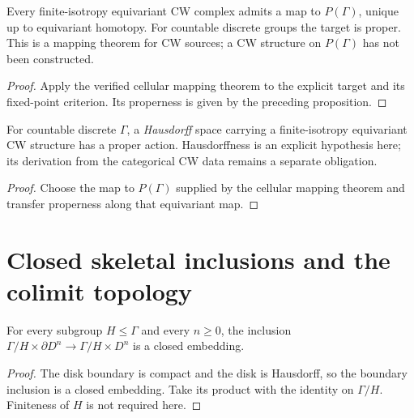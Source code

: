 \begin{proposition}\label{prop:probability-cellular-target}
Every finite-isotropy equivariant CW complex admits a map to $P(\Gamma)$,
unique up to equivariant homotopy. For countable discrete groups the target
is proper. This is a mapping theorem for CW sources; a CW structure on
$P(\Gamma)$ has not been constructed.
\end{proposition}
\begin{proof}
\leanok
Apply the verified cellular mapping theorem to the explicit target and its
fixed-point criterion. Its properness is given by the preceding proposition.
\end{proof}

\begin{proposition}\label{prop:hausdorff-equivariant-cw-proper}
For countable discrete $\Gamma$, a \emph{Hausdorff} space carrying a
finite-isotropy equivariant CW structure has a proper action.
Hausdorffness is an explicit hypothesis here; its derivation from the
categorical CW data remains a separate obligation.
\end{proposition}
\begin{proof}
\leanok
Choose the map to $P(\Gamma)$ supplied by the cellular mapping theorem and
transfer properness along that equivariant map.
\end{proof}

\section{Closed skeletal inclusions and the colimit topology}

\begin{proposition}\label{prop:orbit-boundary-closed-embedding}
\leanok
For every subgroup $H\leq\Gamma$ and every $n\geq0$, the inclusion
$\Gamma/H\times\partial D^n\longrightarrow\Gamma/H\times D^n$ is a closed embedding.
\end{proposition}
\begin{proof}
\leanok
The disk boundary is compact and the disk is Hausdorff, so the boundary
inclusion is a closed embedding. Take its product with the identity on
$\Gamma/H$. Finiteness of $H$ is not required here.
\end{proof}

